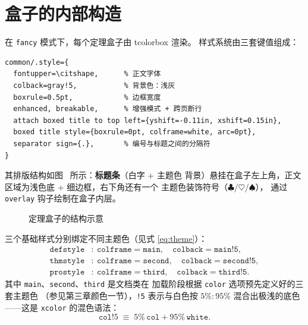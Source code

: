 \section{盒子的内部构造}

在 \texttt{fancy} 模式下，每个定理盒子由 tcolorbox 渲染。
样式系统由三套键值组成：

\begin{lstlisting}
common/.style={
  fontupper=\citshape,      % 正文字体
  colback=gray!5,           % 背景色：浅灰
  boxrule=0.5pt,            % 边框宽度
  enhanced, breakable,      % 增强模式 + 跨页断行
  attach boxed title to top left={yshift=-0.11in, xshift=0.15in},
  boxed title style={boxrule=0pt, colframe=white, arc=0pt},
  separator sign={.},       % 编号与标题之间的分隔符
}
\end{lstlisting}

其排版结构如图~ 所示：\textbf{标题条}（白字 + 主题色
背景）悬挂在盒子左上角，正文区域为浅色底 + 细边框，右下角还有一个
主题色装饰符号（$\clubsuit$/$\heartsuit$/$\spadesuit$），
通过 \texttt{overlay} 钩子绘制在盒子内层。

\begin{figure}[htbp]
  \centering
  \caption{定理盒子的结构示意}\label{fig:box}
\end{figure}

三个基础样式分别绑定不同主题色（见式 \eqref{eq:theme}）：
\begin{equation}
  \begin{aligned}
    \texttt{defstyle} &: \ \texttt{colframe}=\texttt{main},\quad
      \texttt{colback}=\texttt{main!5},\\
    \texttt{thmstyle} &: \ \texttt{colframe}=\texttt{second},\quad
      \texttt{colback}=\texttt{second!5},\\
    \texttt{prostyle} &: \ \texttt{colframe}=\texttt{third},\quad
      \texttt{colback}=\texttt{third!5}.
  \end{aligned}
  \label{eq:theme}
\end{equation}
其中 \texttt{main}、\texttt{second}、\texttt{third} 是文档类在
加载阶段根据 \texttt{color} 选项预先定义好的三套主题色
（参见第三章颜色一节），\texttt{!5} 表示与白色按 $5\%:95\%$
混合出极浅的底色——这是 \texttt{xcolor} 的混色语法：
\begin{equation}
  \texttt{col}!5 \;\equiv\; 5\%\,\texttt{col} + 95\%\,\texttt{white}.
\end{equation}

